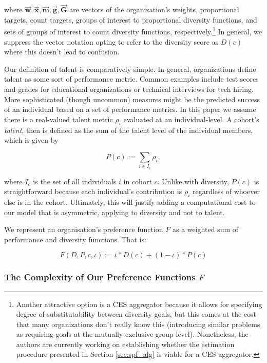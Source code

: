 \noindent where $\vec{\mathbf{w}},\vec{\mathbf{x}}, \vec{\mathbf{m}}, \vec{\mathbf{g}}, \vec{\mathbf{G}}$ are vectors of the organization's weights, proportional targets, count targets, groups of interest to proportional diversity functions, and sets of groups of interest to count diversity functions, respectively.\footnote{Another attractive option is a CES aggregator because it allows for specifying degree of substitutability between diversity goals, but this comes at the cost that many organizations don't really know this (introducing similar problems as requiring goals at the mutually exclusive group level). Nonetheless, the authors are currently working on establishing whether the estimation procedure presented in Section \ref{sec:spf_alg} is viable for a CES aggregator.} In general, we suppress the vector notation opting to refer to the diversity score as $D(c)$ where this doesn't lead to confusion.

Our definition of talent is comparatively simple. In general, organizations define talent as some sort of performance metric. Common examples include test scores and grades for educational organizations or technical interviews for tech hiring. More sophisticated (though uncommon) measures might be the predicted success of an individual based on a set of performance metrics. In this paper we assume there is a real-valued talent metric $\rho_i$ evaluated at an individual-level. A cohort's \emph{talent}, then is defined as the sum of the talent level of the individual members, which is given by

\begin{equation}
P(c) := \sum_{i \in I_c}\rho_i,
\end{equation}

\noindent where $I_c$ is the set of all individuals $i$ in cohort $c$. Unlike with diversity, $P(c)$ is straightforward because each individual's contribution is $\rho_i$ regardless of whoever else is in the cohort. Ultimately, this will justify adding a computational cost to our model that is asymmetric, applying to diversity and not to talent.

We represent an organisation's preference function $F$ as a weighted sum of performance and diversity functions. That is:

\begin{equation}\label{eq:f_spec}
F(D, P, c, \iota) := \iota*D(c)+(1-\iota)*P(c)
\end{equation}

\subsubsection{The Complexity of Our Preference Functions $F$}

